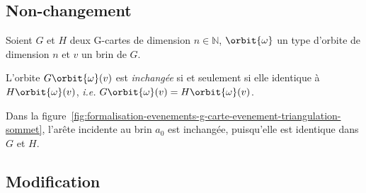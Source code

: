 

\subsection{Non-changement}
\label{sec:formalisation-evenements-transfo-objets-non-changement}


\begin{definition}
	Soient $G$ et $H$ deux G-cartes de dimension $n \in \mathbb{N}$,
	$\orbit{\omega}$ un type d'orbite de dimension $n$ et $v$ un brin de $G$.

	L'orbite $G\orbit{\omega}(v)$ est \emph{inchangée} si et seulement si elle identique à $H\orbit{\omega}(v)$, \textit{i.e.} $G\orbit{\omega}(v) = H\orbit{\omega}(v)$.
\end{definition}

Dans la figure~\ref{fig:formalisation-evenements-g-carte-evenement-triangulation-sommet}, l'arête incidente au brin $a_0$ est inchangée, puisqu'elle est identique dans $G$ et $H$. %





\subsection{Modification}
\label{sec:formalisation-evenements-transfo-objets-modification}


